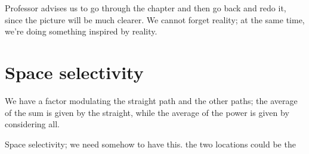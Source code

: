 \documentclass[a4paper, 12pt]{book}
\begin{document}
Professor advises us to go through the chapter and then go back and redo it, since the picture will be much clearer. We cannot forget reality; at the same time, we're doing something inspired by reality.

\section{Space selectivity}

\begin{bluebox}
We have a factor modulating the straight path and the other paths; the average of the sum is given by the straight, while the average of the power is given by considering all.

\begin{center}
\end{center}

Space selectivity; we need somehow to have this. the two locations could be the
\end{bluebox}
\end{document}
